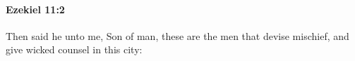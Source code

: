
		\paragraph{Ezekiel 11:2} %
			\label{EZEKIEL-11-2}

			Then said he unto me, Son of man, these are the men that devise mischief, and give wicked counsel in this city:


